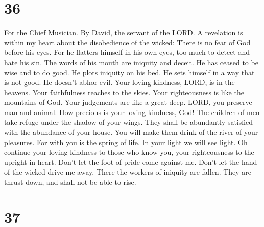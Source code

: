 \hypertarget{section-35}{%
\section{36}\label{section-35}}

For the Chief Musician. By David, the servant of the LORD.
 A revelation is within my heart about the disobedience of
the wicked: There is no fear of God before his eyes.  For
he flatters himself in his own eyes, too much to detect and hate his
sin.  The words of his mouth are iniquity and deceit. He
has ceased to be wise and to do good.  He plots iniquity
on his bed. He sets himself in a way that is not good. He doesn't abhor
evil.  Your loving kindness, LORD, is in the heavens. Your
faithfulness reaches to the skies.  Your righteousness is
like the mountains of God. Your judgements are like a great deep. LORD,
you preserve man and animal.  How precious is your loving
kindness, God! The children of men take refuge under the shadow of your
wings.  They shall be abundantly satisfied with the
abundance of your house. You will make them drink of the river of your
pleasures.  For with you is the spring of life. In your
light we will see light.  Oh continue your loving
kindness to those who know you, your righteousness to the upright in
heart.  Don't let the foot of pride come against me.
Don't let the hand of the wicked drive me away.  There
the workers of iniquity are fallen. They are thrust down, and shall not
be able to rise.

\hypertarget{section-36}{%
\section{37}\label{section-36}}

